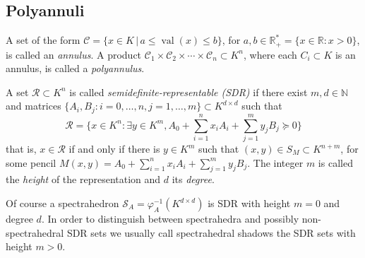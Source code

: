 \documentclass{elsarticle}
\theoremstyle{plain}
\theoremstyle{definition}
\newcommand{\R}{\mathbb{R}} %
\newcommand{\N}{\mathbb{N}} %
\DeclareMathOperator{\val}{val}
\begin{document}
\subsection{Polyannuli}


\begin{definition}[Polyannulus]\label{def_annuli}
  A set of the form $\mathcal{C} = \{x \in K \,|\, a \le \val(x) \le b\}$, for $a,b \in \R^*_+ = \{x \in \R : x>0\}$,
  is called an \emph{annulus}. A product $\mathcal{C}_1 \times \mathcal{C}_2 \times \cdots \times \mathcal{C}_n \subset K^n$,
  where each $C_i \subset K$ is an annulus, is called a \emph{polyannulus}.
\end{definition}

\begin{definition}\label{def_semi_def_rep_set}
  A set $\mathcal{R} \subset K^n$ is called
  \emph{semide\-fi\-nite-re\-pre\-sen\-ta\-ble (SDR)} if there exist $m,d \in \N$ and
  matrices $\{A_i,B_j : i = 0, \ldots, n, j = 1, \ldots, m\} \subset K^{d \times d}$ such that
  $$
  \mathcal{R} = \Big\{x \in K^n : \exists y \in K^m, A_0+\sum_{i=1}^n x_iA_i + \sum_{j=1}^m y_jB_j \succeq 0\Big\}
  $$
  that is, $x \in \mathcal{R}$ if and only if there is $y \in K^m$ such that
  $(x,y) \in S_M \subset K^{n+m}$, for some pencil $M(x,y) = A_0+\sum_{i=1}^n x_iA_i + \sum_{j=1}^m y_jB_j$.
  The integer $m$ is called the \emph{height} of the representation and $d$ its \emph{degree}.
\end{definition}

Of course a spectrahedron $\mathcal{S}_A = \varphi_A^{-1}(K^{d \times d})$ is SDR with height $m=0$ and degree
$d$. In order to distinguish between spectrahedra and possibly non-spectrahedral SDR sets
we usually call {spectrahedral shadows} the SDR sets with height $m>0$.
\end{document}
